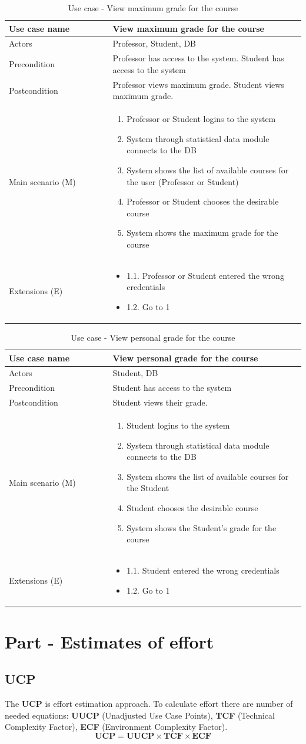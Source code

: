 \documentclass[12pt]{article}
\newcommand\tabularhead[1]{
\begin{table}[h]
  \caption{Use case - #1}
  \begin{tabular}{|p{0.35\linewidth}|p{0.65\linewidth}|}
    \hline
    \textbf{Use case name} & \textbf{#1} \\
    \hline}
\newcommand\addrow[2]{#1 &#2\\ \hline}
\newcommand\adddoublerow[2]{\begin{minipage}[t][][t]{2.5cm}#1\end{minipage}%
    &\begin{minipage}[t][][t]{\linewidth}
     \begin{itemize}\setlength{\itemsep}{0pt}%
        #2     
     \end{itemize}
     \end{minipage}\\ \hline}
\newcommand\addmulrow[2]{ \begin{minipage}[t][][t]{2.5cm}#1\end{minipage}%
     &\begin{minipage}[t][][t]{\linewidth}
      \begin{enumerate}\setlength{\itemsep}{0pt}%
        #2   
      \end{enumerate}
      \end{minipage}\\ \hline}
\newenvironment{usecase}{\tabularhead}
{\hline\end{tabular}\end{table}}
\begin{document}
\begin{usecase}{View maximum grade for the course}
    \addrow{Actors}{Professor, Student, DB}
    \addrow{Precondition}{Professor has access to the system. Student has access to the system}
    \addrow{Postcondition}{Professor views maximum grade. Student views maximum grade.}
    \addmulrow{Main scenario (M)}{
        \item Professor or Student logins to the system
        \item System through statistical data module connects to the DB
        \item System shows the list of available courses for the user (Professor or Student)
        \item Professor or Student chooses the desirable course
        \item System shows the maximum grade for the course
    }
    \adddoublerow{Extensions (E)}{
        \item[] 1.1. Professor or Student entered the wrong credentials
        \item[] 1.2. Go to 1
    }
\end{usecase}
\newpage
\begin{usecase}{View personal grade for the course}
    \addrow{Actors}{Student, DB}
    \addrow{Precondition}{Student has access to the system}
    \addrow{Postcondition}{Student views their grade.}
    \addmulrow{Main scenario (M)}{
        \item Student logins to the system
        \item System through statistical data module connects to the DB
        \item System shows the list of available courses for the Student
        \item Student chooses the desirable course
        \item System shows the Student's grade for the course
    }
    \adddoublerow{Extensions (E)}{
        \item[] 1.1. Student entered the wrong credentials
        \item[] 1.2. Go to 1
    }
\end{usecase}
\section{Part - Estimates of effort}
\subsection{UCP}
The \textbf{UCP} is effort estimation approach. To calculate effort there are number of needed equations: \textbf{UUCP} (Unadjusted Use Case Points), \textbf{TCF} (Technical Complexity Factor), \textbf{ECF} (Environment Complexity Factor). \\
\begin{equation}
    \textbf{UCP} = \textbf{UUCP} \times \textbf{TCF} \times \textbf{ECF}
\end{equation}\\
\end{document}
